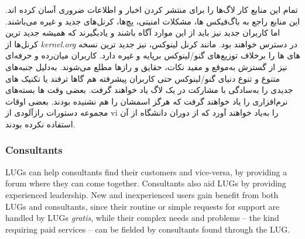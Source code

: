 تمام این منابع کار لاگ‌ها را برای منتشر کردن اخبار و اطلاعات
ضروری آسان کرده اند. این منابع راجع به باگ‌فیکس ها،
مشکلات امنیتی، پچ‌ها، کرنل‌های جدید و غیره می‌باشند.
اما کاربران جدید نیز باید از این موارد آگاه باشند
و یادبگیرند که همیشه جدید ترین کرنل‌ها از
\emph{kernel.org}
در دسترس خواهند بود. مانند کرنل لینوکس،
نیز جدید ترین نسخه های  ها را برخلاف
توزیع‌های گنو/لینوکس برپایه  و غیره دارد.
کاربران میان‌رده و حرفه‌ای نیز از گسترش به‌موقع و مفید
نکات، حقایق و رازها مطلع می‌شوند.
به‌دلیل جنبه‌های متنوع و تنوع دنیای گنو/لینوکس حتی
کاربران پیشرفته هم گاها ترفند یا تکنیک های جدیدی را
به‌سادگی با مشارکت در یک لاگ یاد خواهند گرفت.
بعضی وقت ها بسته‌های نرم‌افزاری را یاد خواهند گرفت که
هرگز اسمشان را هم نشنیده بودند. بعضی اوقات مجموعه دستورات
رازآلودی از {\ttfamily vi} را به‌یاد خواهند آورد که از دوران
دانشگاه از آن استفاده نکرده بودند.

\subsubsection{Consultants}

LUGs can help consultants find their customers and vice-versa,
by providing a forum where they can come together.
Consultants also aid LUGs by providing experienced leadership.
New and inexperienced users gain benefit from both LUGs and
consultants, since their routine or simple requests for support are
handled by LUGs {\itshape gratis\/}, while their complex needs and problems --
the kind requiring paid services -- can be fielded by consultants found 
through the LUG.

